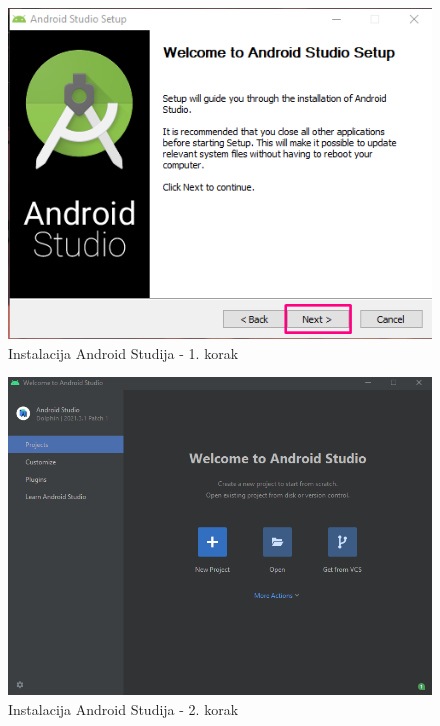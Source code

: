\documentclass[11pt,a4paper,twoside]{article}
\begin{document}
\begin{figure}[!h]
	\centering
	\includegraphics{install_01.png}
	\caption{Instalacija Android Studija - 1. korak}
	\label{fig:install_01}	
\end{figure}

\begin{figure}[!h]
	\centering
	\includegraphics[width=\textwidth]{install_02.png}
	\caption{Instalacija Android Studija - 2. korak}
	\label{fig:install_02}	
\end{figure}
\end{document}
